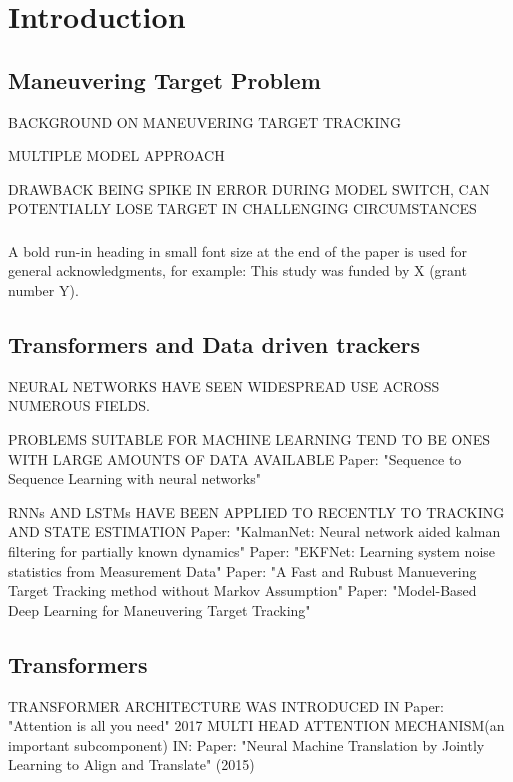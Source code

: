 \documentclass[runningheads]{llncs}
\begin{document}
\section{Introduction}
\subsection{Maneuvering Target Problem}

BACKGROUND ON MANEUVERING TARGET TRACKING

MULTIPLE MODEL APPROACH

DRAWBACK BEING SPIKE IN ERROR DURING MODEL SWITCH, CAN POTENTIALLY LOSE TARGET IN CHALLENGING CIRCUMSTANCES


\subsubsection{\ackname} A bold run-in heading in small font size at the end of the paper is
used for general acknowledgments, for example: This study was funded
by X (grant number Y).

\subsubsection{\discintname}

\subsection{Transformers and Data driven trackers}

NEURAL NETWORKS HAVE SEEN WIDESPREAD USE ACROSS NUMEROUS FIELDS.


PROBLEMS SUITABLE FOR MACHINE LEARNING TEND TO BE ONES WITH LARGE AMOUNTS OF DATA AVAILABLE
Paper: "Sequence to Sequence Learning with neural networks"


RNNs AND LSTMs HAVE BEEN APPLIED TO RECENTLY TO TRACKING AND STATE ESTIMATION 
Paper: "KalmanNet: Neural network aided kalman filtering for partially known dynamics"
Paper: "EKFNet: Learning system noise statistics from Measurement Data"
Paper: "A Fast and Rubust Manuevering Target Tracking method without Markov Assumption"
Paper: "Model-Based Deep Learning for Maneuvering Target Tracking"
\subsection{Transformers}
TRANSFORMER ARCHITECTURE WAS INTRODUCED IN
Paper: "Attention is all you need" 2017
MULTI HEAD ATTENTION MECHANISM(an important subcomponent) IN:
Paper: "Neural Machine Translation by Jointly Learning to Align and Translate" (2015)
\end{document}
